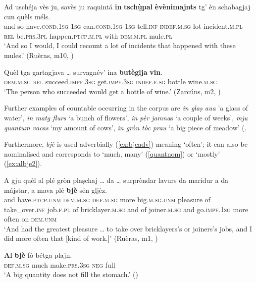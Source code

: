 \ea
\label{ex:intschupal1}
\gll  Ad uschéja vès ju, savès ju raquintá \textbf{in} \textbf{tsch{\`u̱̱}pal} \textbf{èvènimajnts} tg’ èn schabagjaj cun quèls méls.\\
and so have.\textsc{cond.1sg} \textsc{1sg} can.\textsc{cond.1sg} \textsc{1sg} tell.\textsc{inf} \textsc{indef.m.sg} lot incident.\textsc{m.pl} \textsc{rel} be.\textsc{prs.3pl} happen.\textsc{ptcp.m.pl} with \textsc{dem.m.pl} mule.\textsc{pl}\\
\glt `And so I would, I could recount a lot of incidents that happened with these mules.' (Ruèras, m10, )
\z

\ea
\label{ex:buteglja1}
\gll    Quèl tga gartagjava … survagnév’ ina \textbf{butèglja} \textbf{vin}.\\
\textsc{dem.m.sg} \textsc{rel} succeed.\textsc{impf.3sg} {} get.\textsc{impf.3sg} \textsc{indef.f.sg} bottle wine.\textsc{m.sg}\\
\glt `The person who succeeded would get a bottle of wine.' (Zarcúns, m2, )
\z

Further examples of countable  occurring in the corpus are \textit{in glaṣ aua} 'a glass of water', \textit{in matg flurs} `a bunch of flowers', \textit{in pèr jamna}s `a couple of weeks', \textit{mju quantum vacas} `my amount of cows', \textit{in gròn tòc prau} `a big piece of meadow' (\citet[121]{Büchli1966}.

Furthermore, \textit{bjè} is used adverbially (\ref{ex:bjeadv}) meaning `often'; it can also be nominalised and corresponds to `much, many' (\ref{quantnom}) or `mostly' (\ref{ex:albje2}).

\ea
\label{ex:bjeadv}
\gll    A gju quèl al plé gròn plaṣchaj … da … surprèndar lavurs da maridur a da májstar, a mava plé \textbf{bjè} sén gljèz.\\
and have.\textsc{ptcp.unm} \textsc{dem.m.sg} \textsc{def.m.sg} more big.\textsc{m.sg.unm} pleasure {} of {} take\_over.\textsc{inf} job.\textsc{f.pl} of bricklayer.\textsc{m.sg} and of joiner.\textsc{m.sg} and  go.\textsc{impf.1sg} more often on \textsc{dem.unm}\\
\glt `And had the greatest pleasure … to take over bricklayers’s or joiners’s 
jobs, and I did more often that [kind of work.]' (Ruèras, m1, )
\z

\ea\label{quantnom}
\gll    \textbf{Al} \textbf{bjè} fò bétga plajn.\\
     \textsc{def.m.sg} much make.\textsc{prs.3sg} \textsc{neg} full\\
\glt `A big quantity does not fill the stomach.' ()
\z

